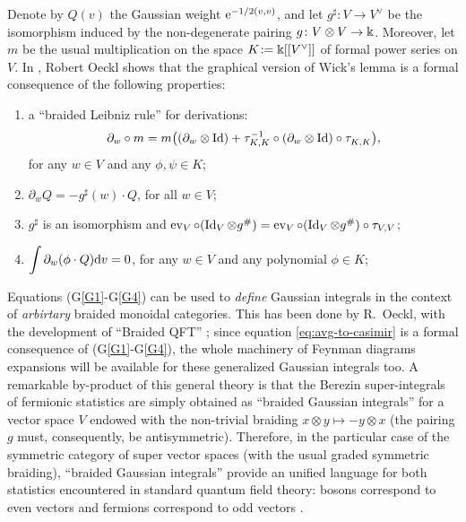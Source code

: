 \begin{remark}
  Denote by $Q(v)$ the Gaussian weight $\mathrm{e}^{-1/2(v,v)}$, and let
  $g^\sharp\colon V\to V^\lor$ be the isomorphism induced by the
  non-degenerate pairing $g\colon V\otimes V\to\Bbbk$. Moreover, let
  $m$ be the usual multiplication on the space $K \joinrel:=
  \fk[[V^\lor]]$ of formal power series on $V$.  In
  \cite{oeckl;braided-qft}, Robert Oeckl shows that the graphical
  version of Wick's lemma is a formal consequence of the following
  properties:
\begin{enumerate}[(G1)]
\item\label{G1} a ``braided Leibniz rule'' for derivations:
\[\partial_w\circ m=m\bigl((\partial_w\otimes
\operatorname{Id})+\tau^{-1}_{K, K}\circ(\partial_w\otimes\operatorname{Id}) \circ \tau^{}_{K,
  K}\bigr),\] for any $w\in V$ and any $\phi, \psi\in K$;
\item\label{G2} $\partial_w Q = -g^\sharp(w)\cdot Q$, for all $w\in V$;
\item\label{G3} $g^\sharp$ is an isomorphism and
$\operatorname{ev}_V\circ(\operatorname{Id}_V\otimes g^\#)=\operatorname{ev}_V\circ(\operatorname{Id}_V\otimes
g^\#)\circ\tau_{V,V}$;
\item\label{G4} 
$\displaystyle{\int\partial_w(\phi\cdot Q)\mathrm{d}v=0}$, for
  any $w\in V$ and any polynomial $\phi\in K$;
\end{enumerate}
Equations (G\ref{G1}-G\ref{G4}) can be used to \emph{define} Gaussian
integrals in the context of \emph{arbirtary} braided monoidal categories.
This has been done by R.~Oeckl, with the development of ``Braided
QFT'' \cite{oeckl;braided-qft}; since equation
\eqref{eq:avg-to-casimir} is a formal consequence of   
(G\ref{G1}-G\ref{G4}), the whole machinery of Feynman diagrams expansions
will be available for these generalized Gaussian integrals too.
A remarkable by-product of this general
theory is that the Berezin super-integrals of fermionic statistics are
simply obtained as ``braided
Gaussian integrals'' for a vector space $V$ endowed with the non-trivial
braiding $x\otimes y\mapsto -y\otimes x$ (the pairing $g$ must,
consequently, be antisymmetric). Therefore, in the particular case
of the symmetric category of super vector spaces (with the usual graded
symmetric braiding), ``braided Gaussian integrals'' provide an unified
language for both statistics encountered in standard quantum field theory:
bosons correspond to even vectors and fermions correspond to odd vectors
\cite[Sections~3.3 and~3.4]{oeckl;spin-and-statistics}.
\end{remark}
